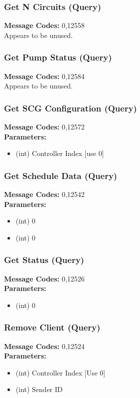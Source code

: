 \documentclass[11pt]{article}
\begin{document}
\subsubsection{Get N Circuits (Query)}
\label{msg:12558}
{\bf Message Codes: } 0,12558\\
Appears to be unused.

\subsubsection{Get Pump Status (Query)}
\label{msg:12584}
{\bf Message Codes: } 0,12584\\
Appears to be unused.

\subsubsection{Get SCG Configuration (Query)}
\label{msg:12572}
{\bf Message Codes: } 0,12572\\
{\bf Parameters: }
\small
\begin{itemize}
\item (int) Controller Index [use 0]
\end{itemize}
\normalsize

\subsubsection{Get Schedule Data (Query)}
\label{msg:12542}
{\bf Message Codes: } 0,12542\\
{\bf Parameters: }
\small
\begin{itemize}
\item (int) 0
\item (int) 0
\end{itemize}
\normalsize

\subsubsection{Get Status (Query)}
\label{msg:12526}
{\bf Message Codes: } 0,12526\\
{\bf Parameters: }
\small
\begin{itemize}
\item (int) 0
\end{itemize}
\normalsize

\subsubsection{Remove Client (Query)}
\label{msg:12524}
{\bf Message Codes: } 0,12524\\
{\bf Parameters: }
\small
\begin{itemize}
\item (int) Controller Index [Use 0]
\item (int) Sender ID
\end{itemize}\normalsize
\end{document}
